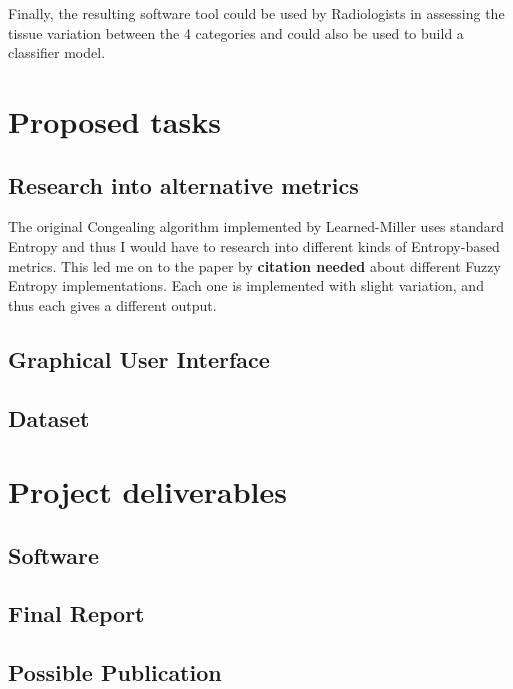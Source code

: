 \documentclass[11pt,fleqn,twoside]{article}
\begin{document}
Finally, the resulting software tool could be used by Radiologists in assessing the tissue variation between the 4 categories and could also be used to build a classifier model.

\section{Proposed tasks}

\subsection{Research into alternative metrics}
The original Congealing algorithm implemented by Learned-Miller uses standard Entropy and thus I would have to research into different kinds of Entropy-based metrics. This led me on to the paper by \textbf{citation needed} about different Fuzzy Entropy implementations. Each one is implemented with slight variation, and thus each gives a different output.

\subsection{Graphical User Interface}

\subsection{Dataset}

\section{Project deliverables}

\subsection{Software}

\subsection{Final Report}

\subsection{Possible Publication}
\end{document}
